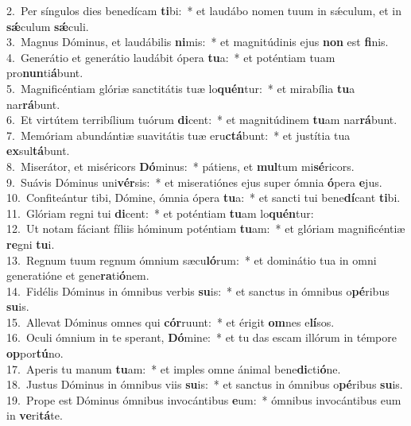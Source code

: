 {2.~}Per síngulos dies benedícam \textbf{ti}bi:~* et laudábo nomen tuum in sǽculum, et in \textbf{sǽ}culum \textbf{sǽ}culi.\\
{3.~}Magnus Dóminus, et laudábilis \textbf{ni}mis:~* et magnitúdinis ejus \textbf{non} est \textbf{fi}nis.\\
{4.~}Generátio et generátio laudábit ópera \textbf{tu}a:~* et poténtiam tuam pro\textbf{nun}ti\textbf{á}bunt.\\
{5.~}Magnificéntiam glóriæ sanctitátis tuæ lo\textbf{quén}tur:~* et mirabília \textbf{tu}a nar\textbf{rá}bunt.\\
{6.~}Et virtútem terribílium tuórum \textbf{di}cent:~* et magnitúdinem \textbf{tu}am nar\textbf{rá}bunt.\\
{7.~}Memóriam abundántiæ suavitátis tuæ eru\textbf{ctá}bunt:~* et justítia tua \textbf{ex}sul\textbf{tá}bunt.\\
{8.~}Miserátor, et miséricors \textbf{Dó}minus:~* pátiens, et \textbf{mul}tum mi\textbf{sé}ricors.\\
{9.~}Suávis Dóminus uni\textbf{vér}sis:~* et miseratiónes ejus super ómnia \textbf{ó}pera \textbf{e}jus.\\
{10.~}Confiteántur tibi, Dómine, ómnia ópera \textbf{tu}a:~* et sancti tui bene\textbf{dí}cant \textbf{ti}bi.\\
{11.~}Glóriam regni tui \textbf{di}cent:~* et poténtiam \textbf{tu}am lo\textbf{quén}tur:\\
{12.~}Ut notam fáciant fíliis hóminum poténtiam \textbf{tu}am:~* et glóriam magnificéntiæ \textbf{re}gni \textbf{tu}i.\\
{13.~}Regnum tuum regnum ómnium sæcu\textbf{ló}rum:~* et dominátio tua in omni generatióne et gene\textbf{ra}ti\textbf{ó}nem.\\
{14.~}Fidélis Dóminus in ómnibus verbis \textbf{su}is:~* et sanctus in ómnibus o\textbf{pé}ribus \textbf{su}is.\\
{15.~}Allevat Dóminus omnes qui \textbf{cór}ruunt:~* et érigit \textbf{om}nes e\textbf{lí}sos.\\
{16.~}Oculi ómnium in te sperant, \textbf{Dó}mine:~* et tu das escam illórum in témpore \textbf{op}por\textbf{tú}no.\\
{17.~}Aperis tu manum \textbf{tu}am:~* et imples omne ánimal bene\textbf{di}cti\textbf{ó}ne.\\
{18.~}Justus Dóminus in ómnibus viis \textbf{su}is:~* et sanctus in ómnibus o\textbf{pé}ribus \textbf{su}is.\\
{19.~}Prope est Dóminus ómnibus invocántibus \textbf{e}um:~* ómnibus invocántibus eum in \textbf{ve}ri\textbf{tá}te.\\
